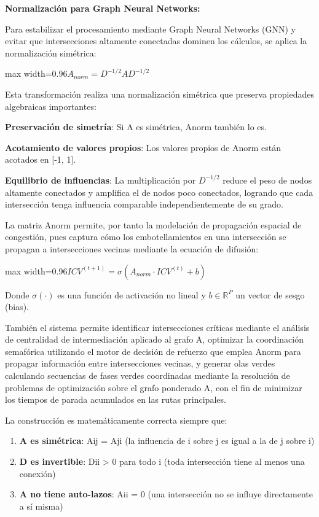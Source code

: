 \documentclass[12pt,a4paper,oneside]{report}
\newenvironment{centeredmath}
  {\begin{center}\begin{adjustbox}{max width=0.96\linewidth}\(\displaystyle}
  {\)\end{adjustbox}\end{center}}
\begin{document}
\textbf{Normalización para Graph Neural Networks:}

Para estabilizar el procesamiento mediante Graph Neural Networks (GNN) y evitar que intersecciones altamente conectadas dominen los cálculos, se aplica la normalización simétrica:

\begin{centeredmath}
A_{norm} = D^{- 1/2}AD^{- 1/2}
\end{centeredmath}

Esta transformación realiza una normalización simétrica que preserva propiedades algebraicas importantes:

\textbf{Preservación de simetría}: Si A es simétrica, Anorm también lo es.

\textbf{Acotamiento de valores propios}: Los valores propios de Anorm están acotados en {[}-1, 1{]}.

\textbf{Equilibrio de influencias}: La multiplicación por \(D^{- 1/2}\) reduce el peso de nodos altamente conectados y amplifica el de nodos poco conectados, logrando que cada intersección tenga influencia comparable independientemente de su grado.

La matriz Anorm permite, por tanto la modelación de propagación espacial de congestión, pues captura cómo los embotellamientos en una intersección se propagan a intersecciones vecinas mediante la ecuación de difusión:

\begin{centeredmath}
ICV^{(t + 1)} = \sigma\!\left(A_{norm} \cdot ICV^{(t)} + b\right)
\end{centeredmath}

Donde \(\sigma(\cdot)\) es una función de activación no lineal y \(b \in \mathbb{R}^{P}\) un vector de sesgo (bias).

También el sistema permite identificar intersecciones críticas mediante el análisis de centralidad de intermediación aplicado al grafo A, optimizar la coordinación semafórica utilizando el motor de decisión de refuerzo que emplea Anorm para propagar información entre intersecciones vecinas, y generar olas verdes calculando secuencias de fases verdes coordinadas mediante la resolución de problemas de optimización sobre el grafo ponderado A, con el fin de minimizar los tiempos de parada acumulados en las rutas principales.

La construcción es matemáticamente correcta siempre que:

\begin{enumerate}
\def\labelenumi{\arabic{enumi}.}
\item
  \textbf{A es simétrica}: Aij = Aji (la influencia de i sobre j es igual a la de j sobre i)
\item
  \textbf{D es invertible}: Dii \textgreater{} 0 para todo i (toda intersección tiene al menos una conexión)
\item
  \textbf{A no tiene auto-lazos}: Aii = 0 (una intersección no se influye directamente a sí misma)
\end{enumerate}
\end{document}

